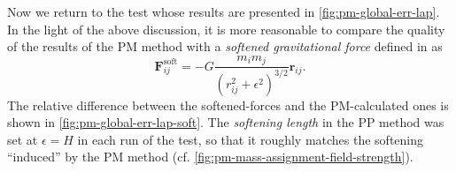 Now we return to the test whose results are presented in \autoref{fig:pm-global-err-lap}.
In the light of the above discussion, it is more reasonable to compare the quality of the results of the PM method with a \textit{softened gravitational force} defined in \cite{Zhang_2019} as
\begin{equation}\label{eq:softened-force}
    \mathbf{F}^\textrm{soft}_{ij} = -G\frac{m_i m_j}{(r_{ij}^2 + \epsilon^2)^{3/2}}\mathbf{r}_{ij}.
\end{equation}
The relative difference between the softened-forces and the PM-calculated ones is shown in \autoref{fig:pm-global-err-lap-soft}.
The \textit{softening length} in the PP method was set at $\epsilon = H$ in each run of the test, so that it roughly matches the softening ``induced'' by the PM method (cf. \autoref{fig:pm-mass-assignment-field-strength}).
